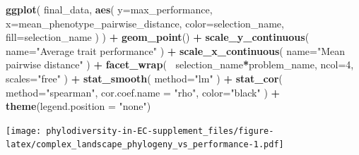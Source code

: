 \documentclass[]{book}
\newenvironment{Shaded}{\begin{snugshade}}{\end{snugshade}}
\newcommand{\DataTypeTok}[1]{\textcolor[rgb]{0.13,0.29,0.53}{#1}}
\newcommand{\DecValTok}[1]{\textcolor[rgb]{0.00,0.00,0.81}{#1}}
\newcommand{\KeywordTok}[1]{\textcolor[rgb]{0.13,0.29,0.53}{\textbf{#1}}}
\newcommand{\NormalTok}[1]{#1}
\newcommand{\OperatorTok}[1]{\textcolor[rgb]{0.81,0.36,0.00}{\textbf{#1}}}
\newcommand{\StringTok}[1]{\textcolor[rgb]{0.31,0.60,0.02}{#1}}
\begin{document}
\begin{Shaded}
\begin{Highlighting}[]
\KeywordTok{ggplot}\NormalTok{(}
\NormalTok{    final_data,}
    \KeywordTok{aes}\NormalTok{(}
        \DataTypeTok{y=}\NormalTok{max_performance,}
        \DataTypeTok{x=}\NormalTok{mean_phenotype_pairwise_distance,}
        \DataTypeTok{color=}\NormalTok{selection_name,}
        \DataTypeTok{fill=}\NormalTok{selection_name}
\NormalTok{    )}
\NormalTok{  ) }\OperatorTok{+}
\StringTok{  }\KeywordTok{geom_point}\NormalTok{() }\OperatorTok{+}
\StringTok{    }\KeywordTok{scale_y_continuous}\NormalTok{(}
        \DataTypeTok{name=}\StringTok{"Average trait performance"}
\NormalTok{  ) }\OperatorTok{+}
\StringTok{  }\KeywordTok{scale_x_continuous}\NormalTok{(}
        \DataTypeTok{name=}\StringTok{"Mean pairwise distance"}
\NormalTok{  ) }\OperatorTok{+}\StringTok{ }
\StringTok{  }\KeywordTok{facet_wrap}\NormalTok{(}
      \OperatorTok{~}\NormalTok{selection_name}\OperatorTok{*}\NormalTok{problem_name, }\DataTypeTok{ncol=}\DecValTok{4}\NormalTok{, }\DataTypeTok{scales=}\StringTok{"free"}
\NormalTok{  ) }\OperatorTok{+}\StringTok{ }
\StringTok{  }\KeywordTok{stat_smooth}\NormalTok{(}
    \DataTypeTok{method=}\StringTok{"lm"}
\NormalTok{  ) }\OperatorTok{+}\StringTok{ }
\StringTok{  }\KeywordTok{stat_cor}\NormalTok{(}
    \DataTypeTok{method=}\StringTok{"spearman"}\NormalTok{, }\DataTypeTok{cor.coef.name =} \StringTok{"rho"}\NormalTok{, }\DataTypeTok{color=}\StringTok{"black"}
\NormalTok{  ) }\OperatorTok{+}
\StringTok{  }\KeywordTok{theme}\NormalTok{(}\DataTypeTok{legend.position =} \StringTok{"none"}\NormalTok{)}
\end{Highlighting}
\end{Shaded}

\texttt{[image: phylodiversity-in-EC-supplement\_files/figure-latex/complex\_landscape\_phylogeny\_vs\_performance-1.pdf]}
\end{document}
